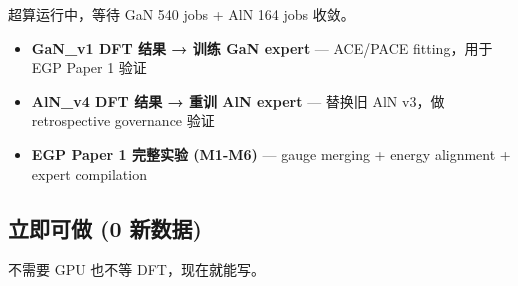 \documentclass[
  12pt,
]{ctexart}
\providecommand{\tightlist}{%
  \setlength{\itemsep}{0pt}\setlength{\parskip}{0pt}}
\begin{document}
超算运行中，等待 GaN 540 jobs + AlN 164 jobs 收敛。

\begin{itemize}
\tightlist
\item[$\square$]
  \textbf{GaN\_v1 DFT 结果 → 训练 GaN expert} --- ACE/PACE fitting，用于
  EGP Paper 1 验证
\item[$\square$]
  \textbf{AlN\_v4 DFT 结果 → 重训 AlN expert} --- 替换旧 AlN v3，做
  retrospective governance 验证
\item[$\square$]
  \textbf{EGP Paper 1 完整实验 (M1-M6)} --- gauge merging + energy
  alignment + expert compilation
\end{itemize}

\subsection{立即可做 (0
新数据)}\label{ux7acbux5373ux53efux505a-0-ux65b0ux6570ux636e}

不需要 GPU 也不等 DFT，现在就能写。
\end{document}
